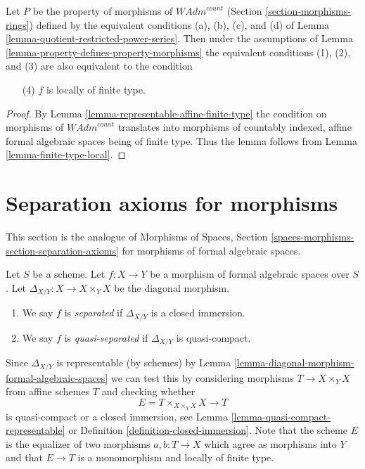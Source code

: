 \begin{lemma}
\label{lemma-finite-type-local-property}
Let $P$ be the property of morphisms of $\textit{WAdm}^{count}$
(Section \ref{section-morphisms-rings})
defined by the
equivalent conditions (a), (b), (c), and (d) of
Lemma \ref{lemma-quotient-restricted-power-series}.
Then under the assumptions of
Lemma \ref{lemma-property-defines-property-morphisms}
the equivalent conditions
(1), (2), and (3) are also equivalent to the condition
\begin{enumerate}
\item[(4)] $f$ is locally of finite type.
\end{enumerate}
\end{lemma}

\begin{proof}
By Lemma \ref{lemma-representable-affine-finite-type}
the condition on morphisms of $\textit{WAdm}^{count}$
translates into morphisms of countably indexed, affine
formal algebraic spaces being of finite type.
Thus the lemma follows from
Lemma \ref{lemma-finite-type-local}.
\end{proof}







\section{Separation axioms for morphisms}
\label{section-separation-axioms}

\noindent
This section is the analogue of
Morphisms of Spaces, Section \ref{spaces-morphisms-section-separation-axioms}
for morphisms of formal algebraic spaces.

\begin{definition}
\label{definition-separated-morphism}
Let $S$ be a scheme.
Let $f : X \to Y$ be a morphism of formal algebraic spaces over $S$.
Let $\Delta_{X/Y} : X \to X \times_Y X$ be the diagonal morphism.
\begin{enumerate}
\item We say $f$ is {\it separated} if $\Delta_{X/Y}$ is a closed immersion.
\item We say $f$ is {\it quasi-separated} if $\Delta_{X/Y}$ is quasi-compact.
\end{enumerate}
\end{definition}

\noindent
Since $\Delta_{X/Y}$ is representable (by schemes) by
Lemma \ref{lemma-diagonal-morphism-formal-algebraic-spaces}
we can test this by considering morphisms $T \to X \times_Y X$
from affine schemes $T$ and checking whether
$$
E = T \times_{X \times_Y X} X \longrightarrow T
$$
is quasi-compact or a closed immersion, see
Lemma \ref{lemma-quasi-compact-representable} or
Definition \ref{definition-closed-immersion}.
Note that the scheme $E$ is the equalizer of two morphisms
$a, b : T \to X$ which agree as morphisms into $Y$
and that $E \to T$ is a monomorphism and locally of finite type.

